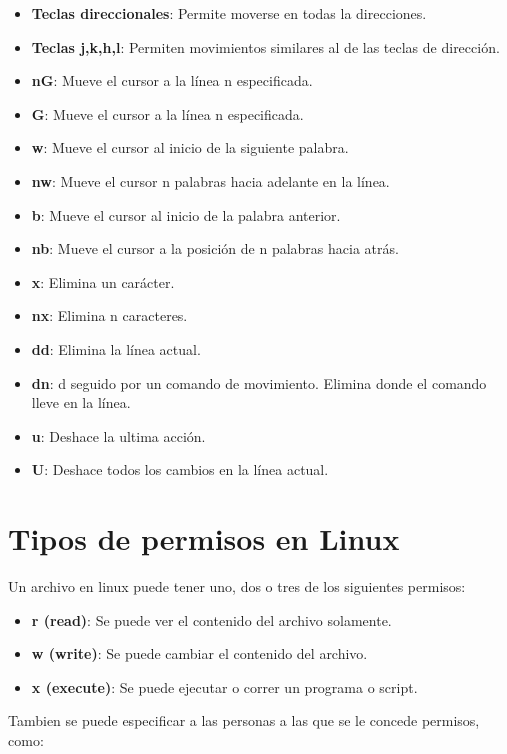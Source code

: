 \documentclass[a4paper,12pt]{article}
\begin{document}
\begin{itemize}
\item{\textbf{Teclas direccionales}}: Permite moverse en todas la direcciones.
\item{\textbf{Teclas j,k,h,l}}: Permiten movimientos similares al de las teclas de dirección.
\item{\textbf{nG}}: Mueve el cursor a la línea n especificada.
\item{\textbf{G}}: Mueve el cursor a la línea n especificada.
\item{\textbf{w}}: Mueve el cursor al inicio de la siguiente palabra.
\item{\textbf{nw}}: Mueve el cursor n palabras hacia adelante en la línea.
\item{\textbf{b}}: Mueve el cursor al inicio de la palabra anterior.
\item{\textbf{nb}}: Mueve el cursor a la posición de n palabras hacia atrás.
\item{\textbf{x}}: Elimina un carácter.
\item{\textbf{nx}}: Elimina n caracteres.
\item{\textbf{dd}}: Elimina la línea actual.
\item{\textbf{dn}}: d seguido por un comando de movimiento. Elimina donde el comando lleve en la línea.
\item{\textbf{u}}: Deshace la ultima acción.
\item{\textbf{U}}: Deshace todos los cambios en la línea actual.
\end{itemize}

\section{Tipos de permisos en Linux}

Un archivo en linux puede tener uno, dos o tres de los siguientes permisos:

\begin{itemize}
\item{\textbf{r (read)}}: Se puede ver el contenido del archivo solamente.
\item{\textbf{w (write)}}: Se puede cambiar el contenido del archivo.
\item{\textbf{x (execute)}}: Se puede ejecutar o correr un programa o script.
\end{itemize}

Tambien se puede especificar a las personas a las que se le concede permisos, como:
\end{document}
